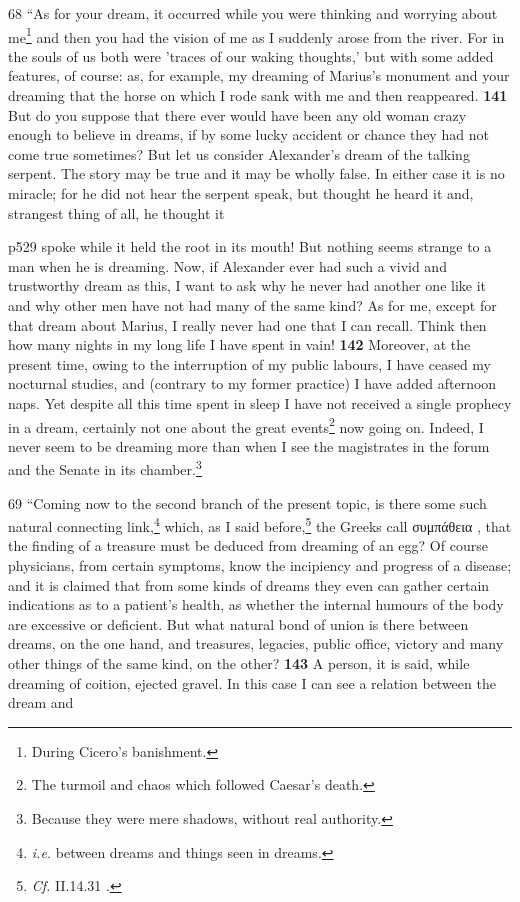 68
``As for your dream, it occurred while you were thinking and worrying about me\texthebrew{}\footnote{During Cicero's banishment.

} and then you had the vision of me as I suddenly arose from the river. For in the souls of us both were 'traces of our waking thoughts,' but with some added features, of course: as, for example, my dreaming of Marius's monument and your dreaming that the horse on which I rode sank with me and then reappeared. \textbf{141} But do you suppose that there ever would have been any old woman crazy enough to believe in dreams, if by some lucky accident or chance they had not come true sometimes? But let us consider Alexander's dream of the talking serpent. The story may be true and it may be wholly false. In either case it is no miracle; for he did not hear the serpent speak, but thought he heard it and, strangest thing of all, he thought it

p529 spoke while it held the root in its mouth! But nothing seems strange to a man when he is dreaming. Now, if Alexander ever had such a vivid and trustworthy dream as this, I want to ask why he never had another one like it and why other men have not had many of the same kind? As for me, except for that dream about Marius, I really never had one that I can recall. Think then how many nights in my long life I have spent in vain! \textbf{142} Moreover, at the present time, owing to the interruption of my public labours, I have ceased my nocturnal studies, and (contrary to my former practice) I have added afternoon naps. Yet despite all this time spent in sleep I have not received a single prophecy in a dream, certainly not one about the great events\texthebrew{}\footnote{The turmoil and chaos which followed Caesar's death.

} now going on. Indeed, I never seem to be dreaming more than when I see the magistrates in the forum and the Senate in its chamber.\footnote{Because they were mere shadows, without real authority.

}

69
``Coming now to the second branch of the present topic, is there some such natural connecting link,\texthebrew{}\footnote{\emph{i.e.} between dreams and things seen in dreams.

} which, as I said before,\texthebrew{}\footnote{\emph{Cf.} II.14.31 .

} the Greeks call \textgreek{συμπάθεια} , that the finding of a treasure must be deduced from dreaming of an egg? Of course physicians, from certain symptoms, know the incipiency and progress of a disease; and it is claimed that from some kinds of dreams they even can gather certain indications as to a patient's health, as whether the internal humours of the body are excessive or deficient. But what natural bond of union is there between dreams, on the one hand, and treasures, legacies, public office, victory and many other things of the same kind, on the other? \textbf{143} A person, it is said, while dreaming of coition, ejected gravel. In this case I can see a relation between the dream and

